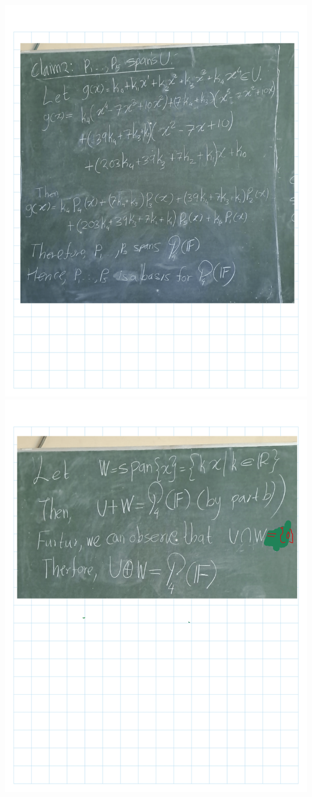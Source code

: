 \documentclass[
]{book}
\theoremstyle{definition}
\theoremstyle{definition}
\theoremstyle{definition}
\theoremstyle{definition}
\theoremstyle{remark}
\begin{document}
\includegraphics{fig/Ex 2B and 2C/Ex 2c (22).png}
\includegraphics{fig/Ex 2B and 2C/Ex 2c (23).png}
\end{document}
